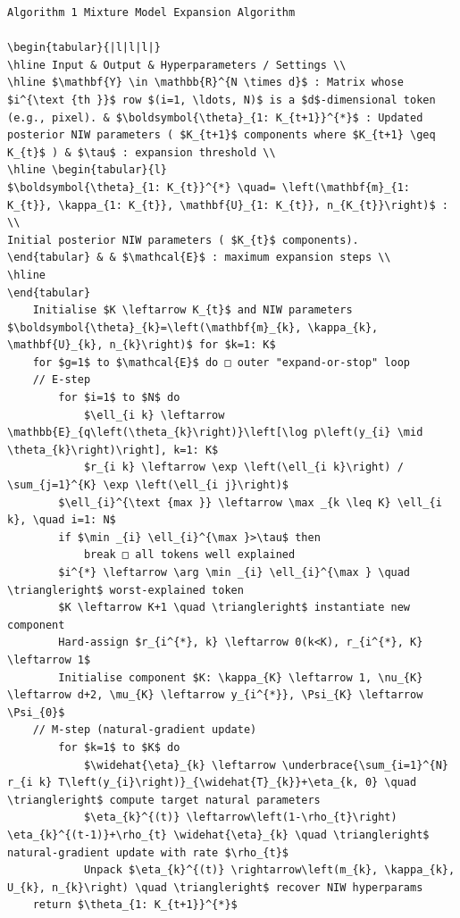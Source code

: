 \documentclass[10pt]{article}
\begin{document}
\begin{verbatim}
Algorithm 1 Mixture Model Expansion Algorithm

\begin{tabular}{|l|l|l|}
\hline Input & Output & Hyperparameters / Settings \\
\hline $\mathbf{Y} \in \mathbb{R}^{N \times d}$ : Matrix whose $i^{\text {th }}$ row $(i=1, \ldots, N)$ is a $d$-dimensional token (e.g., pixel). & $\boldsymbol{\theta}_{1: K_{t+1}}^{*}$ : Updated posterior NIW parameters ( $K_{t+1}$ components where $K_{t+1} \geq K_{t}$ ) & $\tau$ : expansion threshold \\
\hline \begin{tabular}{l}
$\boldsymbol{\theta}_{1: K_{t}}^{*} \quad= \left(\mathbf{m}_{1: K_{t}}, \kappa_{1: K_{t}}, \mathbf{U}_{1: K_{t}}, n_{K_{t}}\right)$ : \\
Initial posterior NIW parameters ( $K_{t}$ components).
\end{tabular} & & $\mathcal{E}$ : maximum expansion steps \\
\hline
\end{tabular}
    Initialise $K \leftarrow K_{t}$ and NIW parameters $\boldsymbol{\theta}_{k}=\left(\mathbf{m}_{k}, \kappa_{k}, \mathbf{U}_{k}, n_{k}\right)$ for $k=1: K$
    for $g=1$ to $\mathcal{E}$ do □ outer "expand-or-stop" loop
    // E-step
        for $i=1$ to $N$ do
            $\ell_{i k} \leftarrow \mathbb{E}_{q\left(\theta_{k}\right)}\left[\log p\left(y_{i} \mid \theta_{k}\right)\right], k=1: K$
            $r_{i k} \leftarrow \exp \left(\ell_{i k}\right) / \sum_{j=1}^{K} \exp \left(\ell_{i j}\right)$
        $\ell_{i}^{\text {max }} \leftarrow \max _{k \leq K} \ell_{i k}, \quad i=1: N$
        if $\min _{i} \ell_{i}^{\max }>\tau$ then
            break □ all tokens well explained
        $i^{*} \leftarrow \arg \min _{i} \ell_{i}^{\max } \quad \triangleright$ worst-explained token
        $K \leftarrow K+1 \quad \triangleright$ instantiate new component
        Hard-assign $r_{i^{*}, k} \leftarrow 0(k<K), r_{i^{*}, K} \leftarrow 1$
        Initialise component $K: \kappa_{K} \leftarrow 1, \nu_{K} \leftarrow d+2, \mu_{K} \leftarrow y_{i^{*}}, \Psi_{K} \leftarrow \Psi_{0}$
    // M-step (natural-gradient update)
        for $k=1$ to $K$ do
            $\widehat{\eta}_{k} \leftarrow \underbrace{\sum_{i=1}^{N} r_{i k} T\left(y_{i}\right)}_{\widehat{T}_{k}}+\eta_{k, 0} \quad \triangleright$ compute target natural parameters
            $\eta_{k}^{(t)} \leftarrow\left(1-\rho_{t}\right) \eta_{k}^{(t-1)}+\rho_{t} \widehat{\eta}_{k} \quad \triangleright$ natural-gradient update with rate $\rho_{t}$
            Unpack $\eta_{k}^{(t)} \rightarrow\left(m_{k}, \kappa_{k}, U_{k}, n_{k}\right) \quad \triangleright$ recover NIW hyperparams
    return $\theta_{1: K_{t+1}}^{*}$
\end{verbatim}
\end{document}

